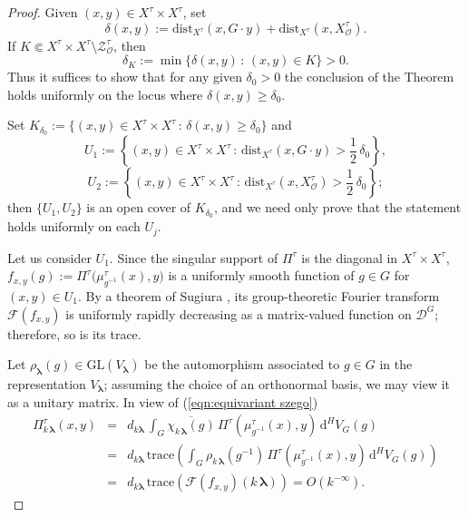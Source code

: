 \documentclass[12pt,a4paper]{article}
\theoremstyle{plain}
\theoremstyle{definition}
\begin{document}
\begin{proof}
Given $(x,y)\in X^\tau\times X^\tau$, set
$$
\delta(x,y)
:=
\mathrm{dist}_{X^\tau}(x,G\cdot y)+
\mathrm{dist}_{X^\tau}
\left(x,X^\tau_{\mathcal{O}}\right).
$$
If $K\Subset X^\tau\times X^\tau\setminus \mathcal{Z}^\tau_{\mathcal{O}}$, then 
$$
\delta_K:=\min\{\delta (x,y)\,:\,
(x,y)\in K\}>0.
$$
Thus it suffices to show that for any given 
$\delta_0>0$ the conclusion of the Theorem
holds uniformly on the locus where $\delta (x,y)\ge \delta_0$.

Set  
$K_{\delta_0}:=\{(x,y)\in X^\tau\times X^\tau\,:\,\delta
(x,y)\ge \delta_0\}$
and
$$
U_1:=\left\{(x,y)\in X^\tau\times X^\tau\,:\,
\mathrm{dist}_{X^\tau}
(x,G\cdot y)> \frac{1}{2}\,\delta_0
\right\},
$$
$$
U_2:=\left\{(x,y)\in X^\tau\times X^\tau\,:\,
\mathrm{dist}_{X^\tau}\left(x,X^\tau_{\mathcal{O}}\right)> 
\frac{1}{2}\,\delta_0
\right\};
$$
then $\{U_1,U_2\}$ is an open cover of $K_{\delta_0}$,
and we need only prove that the statement holds
uniformly on each $U_j$.

Let us consider $U_1$. Since the singular support of $\Pi^\tau$ is the diagonal in $X^\tau\times X^\tau$, 
$f_{x,y}(g):=\Pi^\tau
\big(\mu^\tau_{g^{-1}}(x),y   \big)$ is a uniformly
smooth function of $g\in G$ for $(x,y)\in U_1$.
By a theorem of Sugiura \cite{sug}, 
its group-theoretic Fourier transform 
$\mathcal{F}(f_{x,y})$
is 
uniformly rapidly decreasing
%
as a matrix-valued function on $\mathcal{D}^G$; therefore, so is its trace. 


Let $\rho_{\boldsymbol{\lambda}}(g)\in 
\mathrm{GL}(V_{\boldsymbol{\lambda}})$ be the automorphism
associated to $g\in G$ in the representation 
$V_{\boldsymbol{\lambda}}$; assuming the choice of
an orthonormal basis, we may view it as a unitary matrix.
In view of (\ref{eqn:equivariant szego})
\begin{eqnarray}
\label{eqn:equivariant szego klambda}
\Pi^\tau_{k\,\boldsymbol{\lambda}}(x,y)&=&
d_{k\boldsymbol{\lambda}}\,
\int_G \overline{\chi_{k\,\boldsymbol{\lambda}}(g)}\,
\Pi^\tau
\left(\mu^\tau_{g^{-1}}(x),y   \right)\,
\mathrm{d}^HV_G(g)\nonumber\\
&=&d_{k\boldsymbol{\lambda}}\,
\mathrm{trace}\left(
\int_G \rho_{k\,\boldsymbol{\lambda}}(g^{-1})\,
\Pi^\tau
\left(\mu^\tau_{g^{-1}}(x),y   \right)\,
\mathrm{d}^HV_G(g)\right)\nonumber\\
&=&
d_{k\boldsymbol{\lambda}}\,
\mathrm{trace}\left(\mathcal{F}(f_{x,y})(k\,
\boldsymbol{\lambda})\right)=O\left(k^{-\infty}\right).
\end{eqnarray}


\end{proof}
\end{document}
